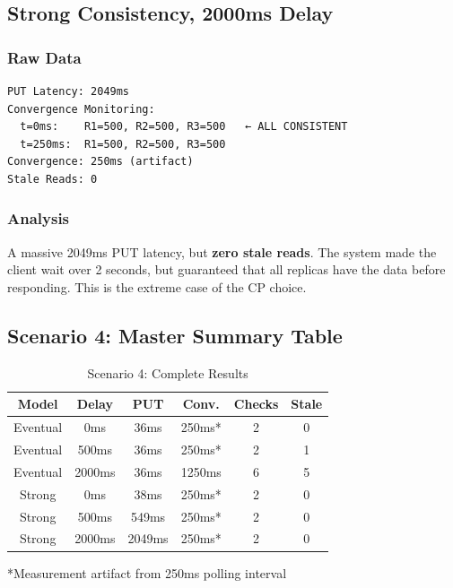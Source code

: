 \documentclass[10pt,a4paper]{article}
\begin{document}
\subsection{Strong Consistency, 2000ms Delay}

\subsubsection{Raw Data}
\begin{verbatim}
PUT Latency: 2049ms
Convergence Monitoring:
  t=0ms:    R1=500, R2=500, R3=500   ← ALL CONSISTENT
  t=250ms:  R1=500, R2=500, R3=500
Convergence: 250ms (artifact)
Stale Reads: 0
\end{verbatim}

\subsubsection{Analysis}

A massive 2049ms PUT latency, but \textbf{zero stale reads}. The system made the client wait over 2 seconds, but guaranteed that all replicas have the data before responding. This is the extreme case of the CP choice.

\subsection{Scenario 4: Master Summary Table}

\begin{table}[H]
\centering
\caption{Scenario 4: Complete Results}
\begin{tabular}{|c|c|c|c|c|c|}
\hline
\textbf{Model} & \textbf{Delay} & \textbf{PUT} & \textbf{Conv.} & \textbf{Checks} & \textbf{Stale} \\
\hline
Eventual & 0ms & 36ms & 250ms* & 2 & 0 \\
Eventual & 500ms & 36ms & 250ms* & 2 & 1 \\
Eventual & 2000ms & 36ms & 1250ms & 6 & 5 \\
\hline
Strong & 0ms & 38ms & 250ms* & 2 & 0 \\
Strong & 500ms & 549ms & 250ms* & 2 & 0 \\
Strong & 2000ms & 2049ms & 250ms* & 2 & 0 \\
\hline
\end{tabular}
\par
*Measurement artifact from 250ms polling interval
\end{table}
\end{document}

